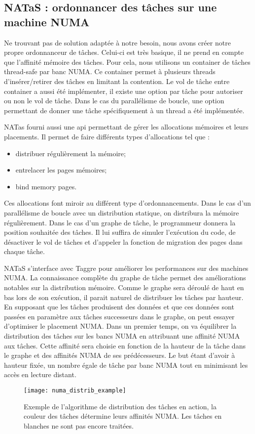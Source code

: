 \subsection{NATaS : ordonnancer des tâches sur une machine NUMA}
Ne trouvant pas de solution adaptée à notre besoin, nous avons créer notre propre ordonnanceur de tâches.
%
Celui-ci est très basique, il ne prend en compte que l'affinité mémoire des tâches.
%
Pour cela, nous utilisons un container de tâches thread-safe par banc NUMA.
%
Ce container permet à plusieurs threads d'insérer/retirer des tâches en limitant la contention.
%
Le vol de tâche entre container a aussi été implémenter, il existe une option par tâche pour autoriser ou non le vol de tâche.
%
Dans le cas du parallélisme de boucle, une option permettant de donner une tâche spécifiquement à un thread a été implémentée.


NATas fourni aussi une api permettant de gérer les allocations mémoires et leurs placements.
%
Il permet de faire différents types d'allocations tel que :
\begin{itemize}
  \item distribuer régulièrement la mémoire;
  \item entrelacer les pages mémoires;
  \item bind memory pages.
\end{itemize}
%
Ces allocations font miroir au différent type d'ordonnancements.
%
Dans le cas d'un parallélisme de boucle avec un distribution statique, on distribura la mémoire régulièrement.
%
Dans le cas d'un graphe de tâche, le programmeur donnera la position souhaitée des tâches.
%
Il lui suffira de simuler l'exécution du code, de désactiver le vol de tâches et d'appeler la fonction de migration des pages dans chaque tâche.



NATaS s'interface avec Taggre pour améliorer les performances sur des machines NUMA.
%
La connaissance complète du graphe de tâche permet des améliorations notables sur la distribution mémoire.
%
Comme le graphe sera déroulé de haut en bas lors de son exécution, il parait naturel de distribuer les tâches par hauteur.
%
En supposant que les tâches produisent des données et que ces données sont passées en paramètre aux tâches successeurs dans le graphe, on peut essayer d'optimiser le placement NUMA.
%
Dans un premier temps, on va équilibrer la distribution des tâches sur les bancs NUMA en attribuant une affinité NUMA aux tâches.
%
Cette affinité sera choisie en fonction de la hauteur de la tâche dans le graphe et des affinités NUMA de ses prédécesseurs.
%
Le but étant d'avoir à hauteur fixée, un nombre égale de tâche par banc NUMA tout en minimisant les accès en lecture distant.



\begin{figure}[t!]
  \centering
  \texttt{[image: numa\_distrib\_example]}
  \caption{Exemple de l'algorithme de distribution des tâches en action, la couleur des tâches détermine leurs affinités NUMA. Les tâches en blanches ne sont pas encore traitées.}
  \label{fig:numa_distrib_example}
\end{figure}
